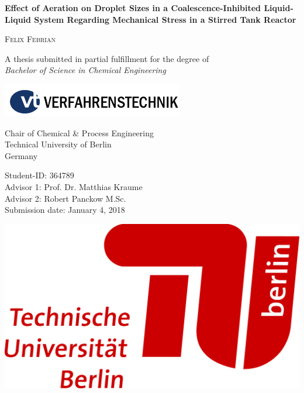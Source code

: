 \begin{titlepage}
\thispagestyle{empty}

\begin{center}
	\LARGE
	\textsf{\textbf{Effect of Aeration on Droplet Sizes in a Coalescence-Inhibited Liquid-Liquid System Regarding Mechanical Stress in a Stirred Tank Reactor}} \\
    \vspace{2cm}

    \large
    \textsc{Felix Febrian}
	\vspace{5cm}

	\large
	A thesis submitted in partial fulfillment for the degree of \\
    \textit{Bachelor of Science in Chemical Engineering}

	\vspace{2cm}
	\includegraphics[scale=1]{pictures/vt_logo.png}

	Chair of Chemical \& Process Engineering \\
	Technical University of Berlin \\
    Germany
\end{center}

\normalsize
\vfill
\noindent   \begin{minipage}{0.6\textwidth} %
Student-ID:			\tabto{4.0cm} 364789	\\
Advisor 1:			\tabto{4.0cm} Prof. Dr. Matthias Kraume \\
Advisor 2:			\tabto{4.0cm} Robert Panckow M.Sc. \\
Submission date:		\tabto{4.0cm} January 4, 2018
\end{minipage}
\begin{minipage}{0.3\textwidth}
    \hfill \includegraphics[scale=0.5]{pictures/TU_Logo_lang_4c_rot.png}
\end{minipage}

\end{titlepage}

